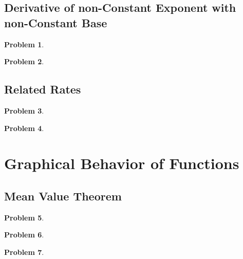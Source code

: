 \documentclass{article}
\newtheorem{problem}{Problem}
\begin{document}
\subsection{Derivative of non-Constant Exponent with non-Constant Base}\label{secMPSDerivativeNonConstExponent}
\begin{problem}

\end{problem}


\begin{problem}

\end{problem}

\subsection{Related Rates}\label{secMPSrelatedRates}
\begin{problem}

\end{problem}

\begin{problem}

\end{problem}



\section{Graphical Behavior of Functions}
\subsection{Mean Value Theorem}\label{secMPS-MVT}

\begin{problem}

\end{problem}


\begin{problem}

\end{problem}

\begin{problem}

\end{problem}

\end{document}
